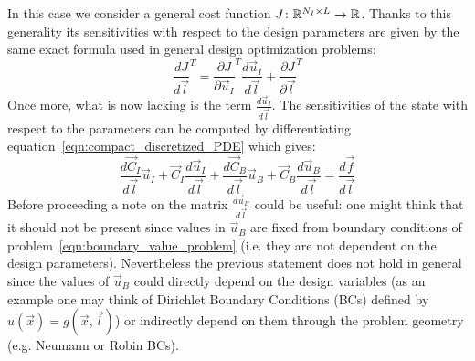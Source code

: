 In this case we consider a general cost function $J \colon \mathbb{R}^{N_I \times L} \to \mathbb{R}$. Thanks to this generality its sensitivities with respect to the design parameters are given by the same exact formula used in general design optimization problems:
\begin{equation}
	\label{eqn:gradient_1st_step_1D_RBF-FD}
	\frac{dJ}{d\vec{l}}^T = \frac{\partial J}{\partial \vec{u}_I}^T \frac{d\vec{u}_I}{d\vec{l}} + \frac{\partial J}{\partial \vec{l}}^T
\end{equation}
Once more, what is now lacking is the term $\frac{d\vec{u}_I}{d\vec{l}}$. The sensitivities of the state with respect to the parameters can be computed by differentiating equation~\eqref{eqn:compact_discretized_PDE} which gives:
\begin{equation}
	\frac{d\vec{C}_I}{d\vec{l}} \vec{u}_I + \vec{C}_I \frac{d\vec{u}_I}{d\vec{l}} + \frac{d\vec{C}_B}{d\vec{l}} \vec{u}_B + \vec{C}_B \frac{d\vec{u}_B}{d\vec{l}} =
	\frac{d\vec{f}}{d\vec{l}}
\end{equation} 
Before proceeding a note on the matrix $\frac{d\vec{u}_B}{d\vec{l}}$ could be useful: one might think that it should not be present since values in $\vec{u}_B$ are fixed from boundary conditions of problem~\eqref{eqn:boundary_value_problem} (i.e. they are not dependent on the design parameters).
Nevertheless the previous statement does not hold in general since the values of $\vec{u}_B$ could directly depend on the design variables (as an example one may think of Dirichlet Boundary Conditions (BCs) defined by $u(\vec{x})=g(\vec{x}, \vec{l})$) or indirectly depend on them through the problem geometry (e.g. Neumann or Robin BCs).

